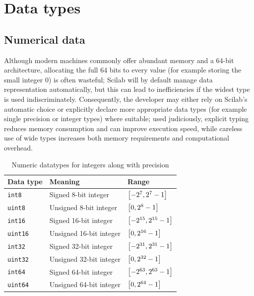 \section{Data types}

	\subsection{Numerical data}
		Although modern machines commonly offer abundant memory and a 64-bit architecture, allocating the full 64 bits to every value (for example storing the small integer 0) is often wasteful; Scilab will by default manage data representation automatically, but this can lead to inefficiencies if the widest type is used indiscriminately. Consequently, the developer may either rely on Scilab's automatic choice or explicitly declare more appropriate data types (for example single precision or integer types) where suitable; used judiciously, explicit typing reduces memory consumption and can improve execution speed, while careless use of wide types increases both memory requirements and computational overhead.
		
		\renewcommand{\arraystretch}{1.5}
		\begin{table}[!htb]
			\centering
			\caption{Numeric datatypes for integers along with precision}
			\label{tab:num-data-types}
			\begin{tabular}{lll}
				\toprule[1.5pt]
				\textbf{Data type} & \textbf{Meaning} & \textbf{Range} \\
				\midrule[1.2pt]
				\texttt{int8} & {Signed 8-bit integer} & {$\qty[-2^7,2^7-1]$} \\ \hline
				\texttt{uint8} & {Unsigned 8-bit integer} & {$\qty[0,2^8-1]$} \\ \hline
				\texttt{int16} & {Signed 16-bit integer} & {$\qty[-2^{15},2^{15}-1]$} \\ \hline
				\texttt{uint16} & {Unsigned 16-bit integer} & {$\qty[0,2^{16}-1]$} \\ \hline
				\texttt{int32} & {Signed 32-bit integer} & {$\qty[-2^{31},2^{31}-1]$} \\ \hline
				\texttt{uint32} & {Unsigned 32-bit integer} & {$\qty[0,2^{32}-1]$} \\ \hline
				\texttt{int64} & {Signed 64-bit integer} & {$\qty[-2^{63},2^{63}-1]$} \\ \hline
				\texttt{uint64} & {Unsigned 64-bit integer} & {$\qty[0,2^{64}-1]$} \\
				\bottomrule[1.5pt]
			\end{tabular}
		\end{table}
		
